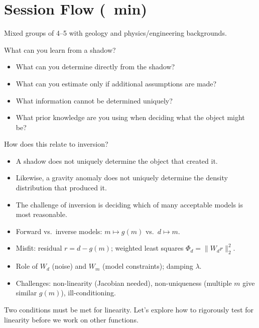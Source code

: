 \section*{Session Flow (\timelinelength\ min)}

Mixed groups of 4--5 with geology and physics/engineering backgrounds.  


What can you learn from a shadow?
\begin{itemize}
  \item What can you determine directly from the shadow?
  \item What can you estimate only if additional assumptions are made?
  \item What information cannot be determined uniquely?
  \item What prior knowledge are you using when deciding what the object might be?
\end{itemize}

How does this relate to inversion?
\begin{itemize}
  \item A shadow does not uniquely determine the object that created it.
  \item Likewise, a gravity anomaly does not uniquely determine the density distribution that produced it.
  \item The challenge of inversion is deciding which of many acceptable models is most reasonable.
\end{itemize}

\begin{itemize}
  \item Forward vs.\ inverse models: $m \mapsto g(m)$ vs.\ $d \mapsto m$.
  \item Misfit: residual $r=d-g(m)$; weighted least squares $\Phi_d=\lVert W_d r\rVert_2^2$.
  \item Role of $W_d$ (noise) and $W_m$ (model constraints); damping $\lambda$.
  \item Challenges: non-linearity (Jacobian needed), non-uniqueness (multiple $m$ give similar $g(m)$), ill-conditioning.
\end{itemize}


Two conditions must be met for linearity.  Let's explore how to rigorously test for linearity before we work on other functions.

